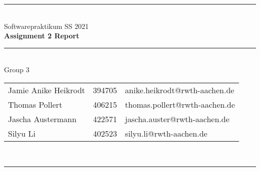 \documentclass[a4paper,12pt]{article}
\begin{document}
\begin{center}
	\rule{\textwidth}{0.1pt}\\[1cm]
	
	\Large Softwarepraktikum SS 2021\\\bf Assignment 2 Report %
\end{center}


\begin{center}

	\rule{\textwidth}{0.1pt}\\[0.5cm]

	{\Large Group 3\\[5mm]} %

	\begin{tabular}{lll}
		Jamie Anike Heikrodt & 394705 & anike.heikrodt@rwth-aachen.de \\

		Thomas Pollert & 406215 & thomas.pollert@rwth-aachen.de \\
		
		Jascha Austermann & 422571 & jascha.auster@rwth-aachen.de \\

		Silyu Li & 402523 & silyu.li@rwth-aachen.de \\

	\end{tabular}\\[0.5cm]

	\rule{\textwidth}{0.1pt}\\[1cm]
	
\end{center}

\newpage
\tableofcontents



\end{document}
